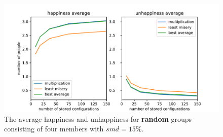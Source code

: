 \begin{figure}
    \centering
    \includegraphics[width=1\textwidth]{./figures/60_evaluation/random_happy_unhappy_total_group_amount-1000_smd-15.pdf}
    \caption{The average happiness and unhappiness for \textbf{random} groups consisting of four members with $smd=15\%$.}
    \label{fig:Evaluation:RandomGroupTotal}
\end{figure}
